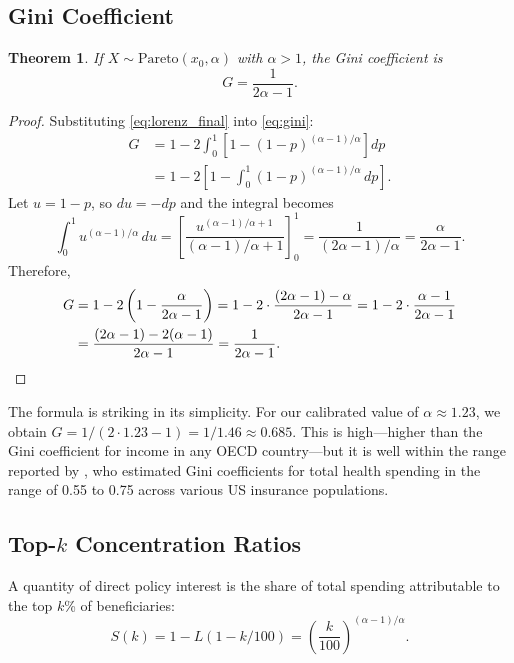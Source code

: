\documentclass[12pt,letterpaper]{article}
\newtheorem{theorem}{Theorem}
\begin{document}
\subsection{Gini Coefficient}

\begin{theorem}\label{thm:gini_pareto}
If $X \sim \mathrm{Pareto}(x_0, \alpha)$ with $\alpha > 1$, the Gini
coefficient is
\begin{equation}\label{eq:gini_pareto}
  G = \frac{1}{2\alpha - 1}.
\end{equation}
\end{theorem}

\begin{proof}
Substituting \eqref{eq:lorenz_final} into \eqref{eq:gini}:
\begin{align*}
  G &= 1 - 2\int_0^1 \left[1 - (1-p)^{(\alpha-1)/\alpha}\right] dp \\
    &= 1 - 2\left[1 - \int_0^1 (1-p)^{(\alpha-1)/\alpha}\, dp\right].
\end{align*}
Let $u = 1 - p$, so $du = -dp$ and the integral becomes
\[
  \int_0^1 u^{(\alpha-1)/\alpha}\, du
  = \left[\frac{u^{(\alpha-1)/\alpha + 1}}{(\alpha-1)/\alpha + 1}\right]_0^1
  = \frac{1}{(2\alpha - 1)/\alpha}
  = \frac{\alpha}{2\alpha - 1}.
\]
Therefore,
\begin{align*}
  G &= 1 - 2\left(1 - \frac{\alpha}{2\alpha - 1}\right)
     = 1 - 2\cdot\frac{(2\alpha - 1) - \alpha}{2\alpha - 1}
     = 1 - 2\cdot\frac{\alpha - 1}{2\alpha - 1} \\
    &= \frac{(2\alpha - 1) - 2(\alpha - 1)}{2\alpha - 1}
     = \frac{1}{2\alpha - 1}. \qedhere
\end{align*}
\end{proof}

The formula is striking in its simplicity. For our calibrated value of
$\alpha \approx 1.23$, we obtain $G = 1/(2 \cdot 1.23 - 1) = 1/1.46 \approx
0.685$. This is high---higher than the Gini coefficient for income in any
OECD country---but it is well within the range reported by
\citet{Diehr1999}, who estimated Gini coefficients for total health spending
in the range of 0.55 to 0.75 across various US insurance populations.

\subsection{Top-$k$ Concentration Ratios}

A quantity of direct policy interest is the share of total spending
attributable to the top $k$\% of beneficiaries:
\begin{equation}\label{eq:topk}
  S(k) = 1 - L(1 - k/100) = \left(\frac{k}{100}\right)^{(\alpha-1)/\alpha}.
\end{equation}
\end{document}
